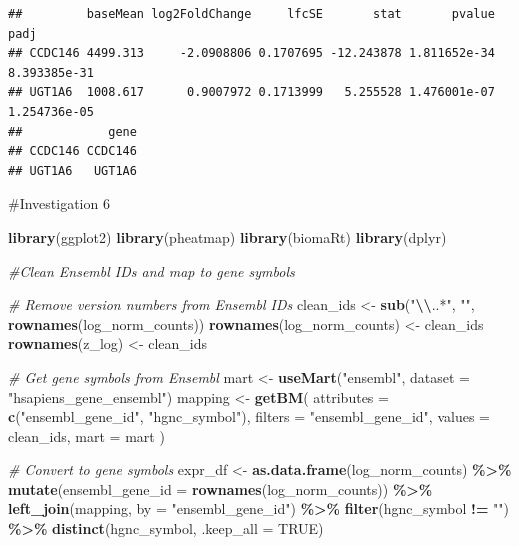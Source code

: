 \documentclass[
]{article}
\newenvironment{Shaded}{\begin{snugshade}}{\end{snugshade}}
\newcommand{\AttributeTok}[1]{\textcolor[rgb]{0.13,0.29,0.53}{#1}}
\newcommand{\CommentTok}[1]{\textcolor[rgb]{0.56,0.35,0.01}{\textit{#1}}}
\newcommand{\ConstantTok}[1]{\textcolor[rgb]{0.56,0.35,0.01}{#1}}
\newcommand{\FunctionTok}[1]{\textcolor[rgb]{0.13,0.29,0.53}{\textbf{#1}}}
\newcommand{\NormalTok}[1]{#1}
\newcommand{\OtherTok}[1]{\textcolor[rgb]{0.56,0.35,0.01}{#1}}
\newcommand{\SpecialCharTok}[1]{\textcolor[rgb]{0.81,0.36,0.00}{\textbf{#1}}}
\newcommand{\StringTok}[1]{\textcolor[rgb]{0.31,0.60,0.02}{#1}}
\begin{document}
\begin{verbatim}
##         baseMean log2FoldChange     lfcSE       stat       pvalue         padj
## CCDC146 4499.313     -2.0908806 0.1707695 -12.243878 1.811652e-34 8.393385e-31
## UGT1A6  1008.617      0.9007972 0.1713999   5.255528 1.476001e-07 1.254736e-05
##            gene
## CCDC146 CCDC146
## UGT1A6   UGT1A6
\end{verbatim}

\#Investigation 6

\begin{Shaded}
\begin{Highlighting}[]
\FunctionTok{library}\NormalTok{(ggplot2)}
\FunctionTok{library}\NormalTok{(pheatmap)}
\FunctionTok{library}\NormalTok{(biomaRt)  }
\FunctionTok{library}\NormalTok{(dplyr)}
\end{Highlighting}
\end{Shaded}

\begin{Shaded}
\begin{Highlighting}[]
\CommentTok{\#Clean Ensembl IDs and map to gene symbols}

\CommentTok{\# Remove version numbers from Ensembl IDs}
\NormalTok{clean\_ids }\OtherTok{\textless{}{-}} \FunctionTok{sub}\NormalTok{(}\StringTok{"}\SpecialCharTok{\textbackslash{}\textbackslash{}}\StringTok{..*"}\NormalTok{, }\StringTok{""}\NormalTok{, }\FunctionTok{rownames}\NormalTok{(log\_norm\_counts))}
\FunctionTok{rownames}\NormalTok{(log\_norm\_counts) }\OtherTok{\textless{}{-}}\NormalTok{ clean\_ids}
\FunctionTok{rownames}\NormalTok{(z\_log) }\OtherTok{\textless{}{-}}\NormalTok{ clean\_ids}

\CommentTok{\# Get gene symbols from Ensembl}
\NormalTok{mart }\OtherTok{\textless{}{-}} \FunctionTok{useMart}\NormalTok{(}\StringTok{"ensembl"}\NormalTok{, }\AttributeTok{dataset =} \StringTok{"hsapiens\_gene\_ensembl"}\NormalTok{)}
\NormalTok{mapping }\OtherTok{\textless{}{-}} \FunctionTok{getBM}\NormalTok{(}
  \AttributeTok{attributes =} \FunctionTok{c}\NormalTok{(}\StringTok{"ensembl\_gene\_id"}\NormalTok{, }\StringTok{"hgnc\_symbol"}\NormalTok{),}
  \AttributeTok{filters =} \StringTok{"ensembl\_gene\_id"}\NormalTok{,}
  \AttributeTok{values =}\NormalTok{ clean\_ids,}
  \AttributeTok{mart =}\NormalTok{ mart}
\NormalTok{)}

\CommentTok{\# Convert to gene symbols}
\NormalTok{expr\_df }\OtherTok{\textless{}{-}} \FunctionTok{as.data.frame}\NormalTok{(log\_norm\_counts) }\SpecialCharTok{\%\textgreater{}\%}
  \FunctionTok{mutate}\NormalTok{(}\AttributeTok{ensembl\_gene\_id =} \FunctionTok{rownames}\NormalTok{(log\_norm\_counts)) }\SpecialCharTok{\%\textgreater{}\%}
  \FunctionTok{left\_join}\NormalTok{(mapping, }\AttributeTok{by =} \StringTok{"ensembl\_gene\_id"}\NormalTok{) }\SpecialCharTok{\%\textgreater{}\%}
  \FunctionTok{filter}\NormalTok{(hgnc\_symbol }\SpecialCharTok{!=} \StringTok{""}\NormalTok{) }\SpecialCharTok{\%\textgreater{}\%}
  \FunctionTok{distinct}\NormalTok{(hgnc\_symbol, }\AttributeTok{.keep\_all =} \ConstantTok{TRUE}\NormalTok{)}
\end{Highlighting}
\end{Shaded}
\end{document}
